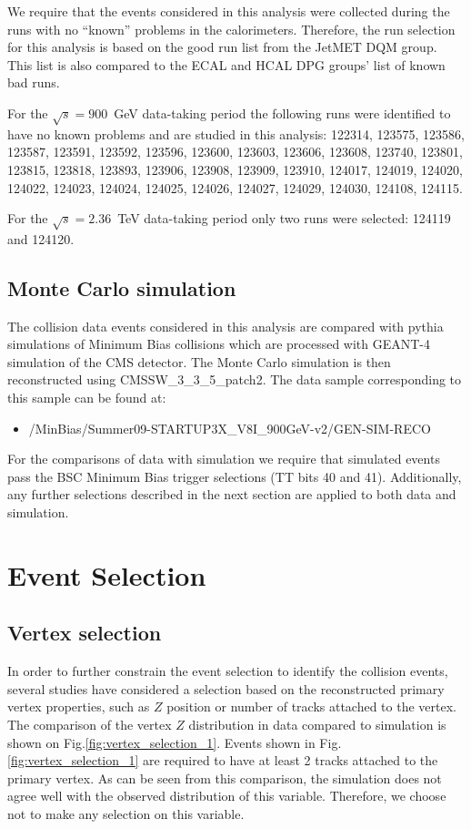 We require that the events considered in this analysis were collected
during the runs with no ``known'' problems in the
calorimeters. Therefore, the run selection for this analysis is based on
the good run list from the JetMET DQM group. This list is also compared
to the ECAL and HCAL DPG groups' list of known bad runs. 

For the $\sqrt{s}=900$~GeV data-taking period the following runs were
identified to have no known problems and are studied in this analysis:
122314, 123575, 123586, 123587, 123591, 123592, 123596, 123600, 123603,
123606, 123608, 123740, 123801, 123815, 123818, 123893, 123906, 123908,
123909, 123910, 124017, 124019, 124020, 124022, 124023, 124024, 124025,
124026, 124027, 124029, 124030, 124108, 124115.

For the $\sqrt{s}=2.36$~TeV data-taking period only two runs were
selected: 124119 and 124120.

\subsection{Monte Carlo simulation}

The collision data events considered in this analysis are compared with
{\sc pythia} simulations of Minimum Bias collisions which are processed
with {\sc GEANT-4} simulation of the CMS detector. The Monte Carlo
simulation is then reconstructed using CMSSW\_3\_3\_5\_patch2. The data
sample corresponding to this sample can be found at:
\begin{itemize}
\item /MinBias/Summer09-STARTUP3X\_V8I\_900GeV-v2/GEN-SIM-RECO
\end{itemize}
For the comparisons of data with simulation we require that
simulated events pass the BSC Minimum Bias trigger selections (TT bits
40 and 41). Additionally, any further selections described in the next
section are applied to both data and simulation.

\section{Event Selection}

\subsection{Vertex selection}

In order to further constrain the event selection to identify the
collision events, several studies have considered a selection based on
the reconstructed primary vertex properties, such as $Z$ position or
number of tracks attached to the vertex. The comparison of the vertex
$Z$ distribution in data compared to simulation is shown on
Fig.\ref{fig:vertex_selection_1}. Events shown in
Fig.\ref{fig:vertex_selection_1}  are required to have at least 2 tracks
attached to the primary vertex. As can be seen from this comparison,
the simulation does not agree well with the observed distribution of
this variable. Therefore, we choose not to make any selection on this variable.

